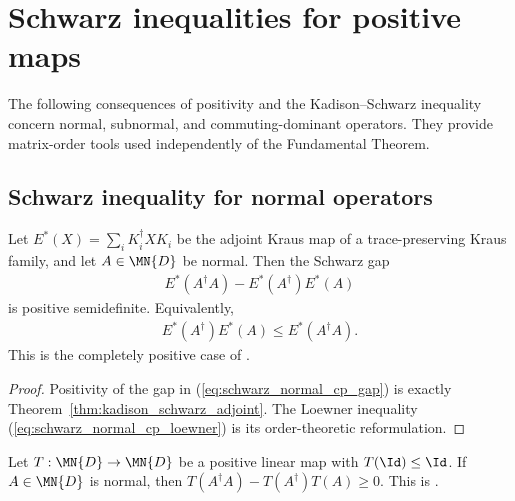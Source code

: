 \section{Schwarz inequalities for positive maps}

The following consequences of positivity and the Kadison--Schwarz inequality
concern normal, subnormal, and commuting-dominant operators. They provide
matrix-order tools used independently of the Fundamental Theorem.

\subsection{Schwarz inequality for normal operators}

\begin{theorem}\label{thm:ks_normal_cp}
    \leanok
    Let $E^*(X)=\sum_i K_i^\dagger X K_i$ be the adjoint Kraus map of a
    trace-preserving Kraus family, and let $A\in\MN{D}$ be normal.
    Then the Schwarz gap
    \begin{align}
        E^*(A^\dagger A)-E^*(A^\dagger)E^*(A)
        \label{eq:schwarz_normal_cp_gap}
    \end{align}
    is positive semidefinite. Equivalently,
    \begin{align}
        E^*(A^\dagger)E^*(A)
        \le E^*(A^\dagger A).
        \label{eq:schwarz_normal_cp_loewner}
    \end{align}
    This is the completely positive case of
    \cite[Proposition~5.1]{Wolf2012Quantum}.
\end{theorem}

\begin{proof}
    \leanok
    Positivity of the gap in
    (\ref{eq:schwarz_normal_cp_gap}) is exactly
    Theorem~\ref{thm:kadison_schwarz_adjoint}. The Loewner inequality
    (\ref{eq:schwarz_normal_cp_loewner}) is its order-theoretic
    reformulation.
\end{proof}

\begin{theorem}\label{thm:schwarz_normal_operator}
    \leanok
    Let $T:\MN{D}\to\MN{D}$ be a positive linear map with
    $T(\Id)\le\Id$. If $A\in\MN{D}$ is normal, then
    $T(A^\dagger A)-T(A^\dagger)T(A)\ge0$.
    This is \cite[Proposition~5.1]{Wolf2012Quantum}.
\end{theorem}

